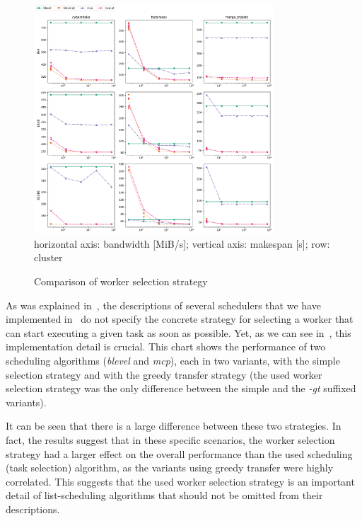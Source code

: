 \begin{figure}
	\centering
	\includegraphics[width=0.8\textwidth]{imgs/estee/charts/gt-scheduler}\\
	{\small horizontal axis: bandwidth [MiB/s]; vertical axis:
	makespan [s]; row: cluster}
	\caption{Comparison of worker selection strategy}
	\label{fig:estee-chart-gt-scheduler}
\end{figure}

As was explained in~, the descriptions of several schedulers that we have
implemented in~\estee{} do not specify the concrete strategy for selecting a worker
that can start executing a given task as soon as possible. Yet, as we can see
in~, this implementation detail is crucial. This chart shows the performance
of two scheduling algorithms (\emph{blevel} and \emph{mcp}), each in two
variants, with the simple selection strategy and with the greedy transfer strategy (the used worker
selection strategy was the only difference between the simple and the \emph{-gt}
suffixed variants).

It can be seen that there is a large difference between these two strategies. In fact, the results
suggest that in these specific scenarios, the worker selection strategy had a larger effect on the
overall performance than the used scheduling (task selection) algorithm, as the variants using
greedy transfer were highly correlated. This suggests that the used worker selection strategy is an
important detail of list-scheduling algorithms that should not be omitted from their descriptions.


